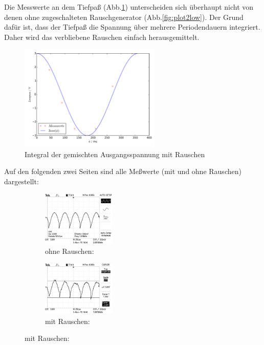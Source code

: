 Die Messwerte an dem Tiefpaß (Abb.\ref{fig:plot3low}) unterscheiden sich
überhaupt nicht von denen ohne zugeschalteten
Rauschgenerator (Abb.\ref{fig:plot2low}).
Der Grund dafür ist, dass der Tiefpaß die Spannung über mehrere
Periodendauern integriert. Daher wird das verbliebene Rauschen einfach
herausgemittelt.
\begin{figure}[H]
  \centering
  \includegraphics[width=0.6\textwidth, height=0.3\textwidth]{plot3low.pdf}
  \caption{Integral der gemischten Ausgangsspannung mit Rauschen}
  \label{fig:plot3low}
\end{figure}
Auf den folgenden zwei Seiten sind alle Meßwerte (mit und ohne Rauschen)
dargestellt:
\newpage
\captionsetup{labelformat=empty}
\begin{figure}[H]
  \caption*{$U_{out} ( \phi = 0°$) }
  \centering
  \begin{subfigure}{0.48\textwidth}
      \centering
      \caption*{ohne Rauschen:}
      \includegraphics[angle=90,height=2.6cm]{graphics/ALL0031/F0031TEK.jpg}
  \end{subfigure}
  \begin{subfigure}{0.48\textwidth}
      \centering
      \caption*{mit Rauschen:}
      \includegraphics[angle=90,height=2.6cm]{graphics/ALL0039/F0039TEK.jpg}
  \end{subfigure}
\end{figure}
\addtocounter{figure}{-1}
